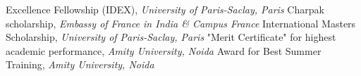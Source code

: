 %
%
%


\begin{scholarship}
					{Excellence Fellowship (IDEX), \textit{University of Paris-Saclay, Paris}}
					{{Charpak scholarship}, \textit{Embassy of France in India \& Campus France}}
					{International Master\textquotesingle s Scholarship, \textit{University of Paris-Saclay, Paris}}
					{"Merit Certificate" for highest academic performance, \textit{Amity University, Noida}}
					{Award for Best Summer Training, \textit{Amity University, Noida}}
\end{scholarship}